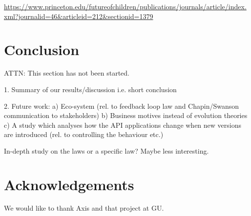 \documentclass{sig-alternate}
\begin{document}
\url{https://www.princeton.edu/futureofchildren/publications/journals/article/index.xml?journalid=46&articleid=212&sectionid=1379}


























\newpage

\section{Conclusion} \label{conclusion}
ATTN: This section has not been started. 

1. Summary of our results/discussion i.e. short conclusion


2. Future work:
       a) Eco-system (rel. to feedback loop law and Chapin/Swanson communication to stakeholders)
       b) Business motives instead of evolution theories
       c) A study which analyses how the API applications change when new versions are introduced (rel. to controlling the behaviour etc.)

       In-depth study on the laws or a specific law? Maybe less interesting.







\section{Acknowledgements}
We would like to thank Axis and that project at GU. 


 
\end{document}

